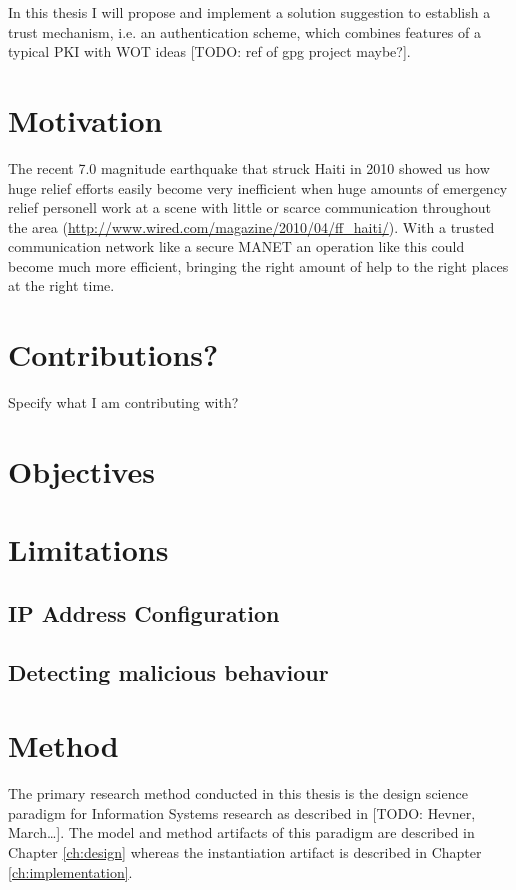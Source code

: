 In this thesis I will propose and implement a solution suggestion to establish a
trust mechanism, i.e. an authentication scheme, which combines features of a
typical \ac{PKI} with \ac{WOT} ideas [TODO: ref of gpg project maybe?].


\section{Motivation}
The recent 7.0 magnitude earthquake that struck Haiti in 2010 showed us how huge
relief efforts easily become very inefficient when huge amounts of emergency
relief personell work at a scene with little or scarce communication throughout
the area (\url{http://www.wired.com/magazine/2010/04/ff_haiti/}). With a trusted
communication network like a secure \ac{MANET} an operation like this could
become much more efficient, bringing the right amount of help to the right
places at the right time.

\section{Contributions?}
Specify what I am contributing with?

\section{Objectives}

\section{Limitations}

\subsection{IP Address Configuration}
\label{limit:ip_address_conf}

\subsection{Detecting malicious behaviour}
\label{limit:malicious_behaviour}


\section{Method}
The primary research method conducted in this thesis is the design science
paradigm for Information Systems research as described in [TODO: Hevner,
March\ldots]. The model and method artifacts of this paradigm are described in
Chapter \ref{ch:design} whereas the instantiation artifact is described in
Chapter \ref{ch:implementation}.

